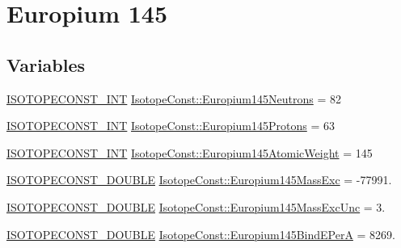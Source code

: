 \hypertarget{group___isotope_const-_europium-_eu145}{}\section{Europium 145}
\label{group___isotope_const-_europium-_eu145}
\subsection*{Variables}
\begin{DoxyCompactItemize}
\item 
\mbox{\hyperlink{group___isotope_const-_macros_ga5f18360b3e99483a35c32d789e62621c}{I\+S\+O\+T\+O\+P\+E\+C\+O\+N\+S\+T\+\_\+\+I\+NT}} \mbox{\hyperlink{group___isotope_const-_europium-_eu145_ga735f26a6a1898f824bae6a516e99b869}{Isotope\+Const\+::\+Europium145\+Neutrons}} = 82
\item 
\mbox{\hyperlink{group___isotope_const-_macros_ga5f18360b3e99483a35c32d789e62621c}{I\+S\+O\+T\+O\+P\+E\+C\+O\+N\+S\+T\+\_\+\+I\+NT}} \mbox{\hyperlink{group___isotope_const-_europium-_eu145_gaa0c75def0ab0afb037ee3953913774e4}{Isotope\+Const\+::\+Europium145\+Protons}} = 63
\item 
\mbox{\hyperlink{group___isotope_const-_macros_ga5f18360b3e99483a35c32d789e62621c}{I\+S\+O\+T\+O\+P\+E\+C\+O\+N\+S\+T\+\_\+\+I\+NT}} \mbox{\hyperlink{group___isotope_const-_europium-_eu145_gac7b1773ebe104b022d7710cfeccdb004}{Isotope\+Const\+::\+Europium145\+Atomic\+Weight}} = 145
\item 
\mbox{\hyperlink{group___isotope_const-_macros_ga8f45a7272ce02c0b4c65c44636ed719a}{I\+S\+O\+T\+O\+P\+E\+C\+O\+N\+S\+T\+\_\+\+D\+O\+U\+B\+LE}} \mbox{\hyperlink{group___isotope_const-_europium-_eu145_ga6226afeb97c4c2869af0a4d3ed588625}{Isotope\+Const\+::\+Europium145\+Mass\+Exc}} = -\/77991.
\item 
\mbox{\hyperlink{group___isotope_const-_macros_ga8f45a7272ce02c0b4c65c44636ed719a}{I\+S\+O\+T\+O\+P\+E\+C\+O\+N\+S\+T\+\_\+\+D\+O\+U\+B\+LE}} \mbox{\hyperlink{group___isotope_const-_europium-_eu145_gacca802d8600b30f0b5a3017bcbc5d5e6}{Isotope\+Const\+::\+Europium145\+Mass\+Exc\+Unc}} = 3.
\item 
\mbox{\hyperlink{group___isotope_const-_macros_ga8f45a7272ce02c0b4c65c44636ed719a}{I\+S\+O\+T\+O\+P\+E\+C\+O\+N\+S\+T\+\_\+\+D\+O\+U\+B\+LE}} \mbox{\hyperlink{group___isotope_const-_europium-_eu145_gad47df945f6d66153e239ec3f6742a3d4}{Isotope\+Const\+::\+Europium145\+Bind\+E\+PerA}} = 8269.
\item 

\end{DoxyCompactItemize}
